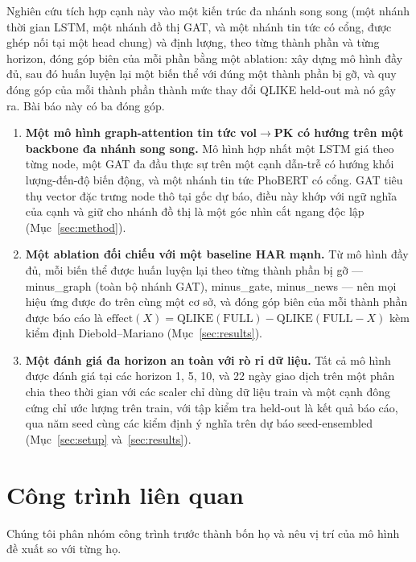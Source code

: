 \documentclass[runningheads]{llncs}
\begin{document}
Nghiên cứu tích hợp cạnh này vào một kiến trúc đa nhánh song song (một nhánh thời gian LSTM, một nhánh
đồ thị GAT, và một nhánh tin tức có cổng, được ghép nối tại một head chung) và định lượng, theo từng
thành phần và từng horizon, đóng góp biên của mỗi phần bằng một ablation: xây dựng mô hình đầy đủ, sau đó
huấn luyện lại một biến thể với đúng một thành phần bị gỡ, và quy đóng góp của mỗi thành phần thành mức
thay đổi QLIKE held-out mà nó gây ra. Bài báo này có ba đóng góp.
\begin{enumerate}
\item \textbf{Một mô hình graph-attention tin tức vol$\to$PK có hướng trên một backbone đa nhánh song
song.} Mô hình hợp nhất một LSTM giá theo từng node, một GAT đa đầu thực sự trên một cạnh dẫn-trễ có
hướng khối lượng-đến-độ biến động, và một nhánh tin tức PhoBERT có cổng. GAT tiêu thụ vector đặc trưng
node thô tại gốc dự báo, điều này khớp với ngữ nghĩa của cạnh và giữ cho nhánh đồ thị là một góc nhìn
cắt ngang độc lập (Mục~\ref{sec:method}).
\item \textbf{Một ablation đối chiếu với một baseline HAR mạnh.} Từ mô hình đầy đủ, mỗi biến thể được
huấn luyện lại theo từng thành phần bị gỡ --- minus\_graph (toàn bộ nhánh GAT), minus\_gate, minus\_news
--- nên mọi hiệu ứng được đo trên cùng một cơ sở, và đóng góp biên của mỗi thành phần được báo cáo là
$\text{effect}(X)=\text{QLIKE}(\text{FULL})-\text{QLIKE}(\text{FULL}{-}X)$ kèm kiểm định
Diebold--Mariano (Mục~\ref{sec:results}).
\item \textbf{Một đánh giá đa horizon an toàn với rò rỉ dữ liệu.} Tất cả mô hình được đánh giá tại các
horizon 1, 5, 10, và 22 ngày giao dịch trên một phân chia theo thời gian với các scaler chỉ dùng dữ liệu
train và một cạnh đông cứng chỉ ước lượng trên train, với tập kiểm tra held-out là kết quả báo cáo, qua
năm seed cùng các kiểm định ý nghĩa trên dự báo seed-ensembled (Mục~\ref{sec:setup}
và~\ref{sec:results}).
\end{enumerate}

\section{Công trình liên quan}
\label{sec:related}
Chúng tôi phân nhóm công trình trước thành bốn họ và nêu vị trí của mô hình đề xuất so với từng họ.
\end{document}
